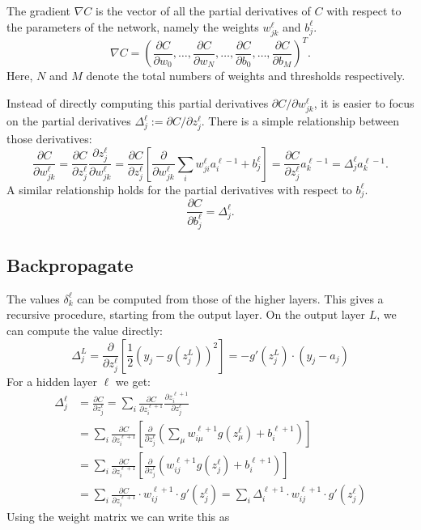 \documentclass{article}
\begin{document}
    The gradient $\nabla C$ is the vector of all the partial derivatives of $C$ with respect to 
    the parameters of the network, namely the weights $w_{jk}^\ell$ and $b_j^\ell$. 
    \[
      \nabla C = 
      \left(\frac{\partial C}{\partial w_0}, 
      \ldots,\frac{\partial C}{\partial w_N}, 
      \ldots,\frac{\partial C}{\partial b_0},
      \ldots,\frac{\partial C}{\partial b_M}
    \right)^T. 
    \]
    Here, $N$ and $M$ denote the total numbers of weights and thresholds respectively.

    Instead of directly computing this partial derivatives 
    $\partial C/ \partial w_{jk}^\ell$, it is easier to focus on the 
    partial derivatives $\Delta_j^\ell := \partial C/ \partial z_j^\ell$. There is a simple relationship between 
    those derivatives:
    \[
        \frac{\partial C}{\partial w_{jk}^\ell} = 
        \frac{\partial C}{\partial z_j^\ell} 
        \frac{\partial z_j^\ell}{\partial w_{jk}^\ell} =
        \frac{\partial C}{\partial z_j^\ell} 
        \left[ \frac{\partial}{\partial w_{jk}^\ell} \sum_i w_{ji}^\ell a_{i}^{\ell-1} + b_j^\ell \right] = 
        \frac{\partial C}{\partial z_j^\ell} a_{k}^{\ell-1}
        = \Delta_j^\ell a_k^{\ell-1}.
    \]
    A similar relationship holds for the partial derivatives with respect to $b_j^\ell$. 
    \[
        \frac{\partial C}{\partial b_{j}^\ell} = \Delta_j^\ell.
    \]

    \subsection{Backpropagate}

    The values $\delta_k^\ell$ can be computed from those of the higher layers. 
    This gives a recursive procedure, starting from the output layer. 
    On the output layer $L$, we can compute the value directly:
    \[
       \Delta_j^L = \frac{\partial}{\partial z_j^\ell} 
       \left[\frac12 \left(y_j - g(z_j^L)\right)^2 \right] = 
       -g'(z_j^L) \cdot (y_j - a_j)
    \]
    For a hidden layer $\ell$ we get: 
    \begin{align*}
        \Delta_j^\ell &= \frac{\partial C}{\partial z_j^\ell} =
        \sum_i
        \frac{\partial C}{\partial z_i^{\ell+1}}
        \frac{\partial z_i^{\ell+1}}{\partial z_j^\ell} \\
        &= \sum_{i} 
        \frac{\partial C}{\partial z_i^{\ell+1}} \left[
        \frac{\partial}{\partial z_j^\ell} \left(\sum_\mu w_{i \mu}^{\ell+1} 
        g(z_\mu^\ell) + b_i^{\ell+1}\right) \right]\\
        &= \sum_{i} 
        \frac{\partial C}{\partial z_i^{\ell+1}} \left[
        \frac{\partial}{\partial z_j^\ell} \left(w_{i j}^{\ell+1} g(z_j^\ell) 
        + b_i^{\ell+1}
        \right) \right]\\
        &= \sum_{i} 
        \frac{\partial C}{\partial z_i^{\ell+1}}
        \cdot w_{i j}^{\ell+1} \cdot g'(z_j^\ell)
        = \sum_{i} 
        \Delta_i^{\ell+1}
        \cdot w_{i j}^{\ell+1} \cdot g'(z_j^\ell)
    \end{align*}
    Using the weight matrix we can write this as 
\end{document}
